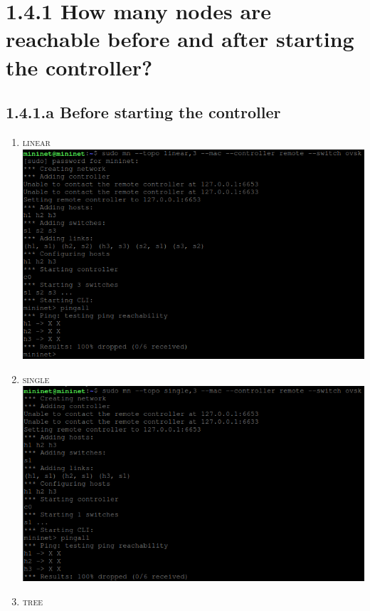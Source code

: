 \documentclass{article}
\begin{document}
	\pagestyle{fancy}
	\hfill
	
	\section*{1.4.1 How many nodes are reachable before and after starting the controller?}
	\begin{adjustwidth}{2em}{2em}
		\subsection*{1.4.1.a Before starting the controller}
		\begin{adjustwidth}{2em}{2em}
		\begin{enumerate}
			\item \textsc{linear} \\
			\includegraphics[scale=0.4]{linear_before.png}
			\item \textsc{single} \\
			\includegraphics[scale=0.4]{single_before.png}
			\item \textsc{tree} \\

\end{enumerate}
\end{adjustwidth}
\end{adjustwidth}
\end{document}
